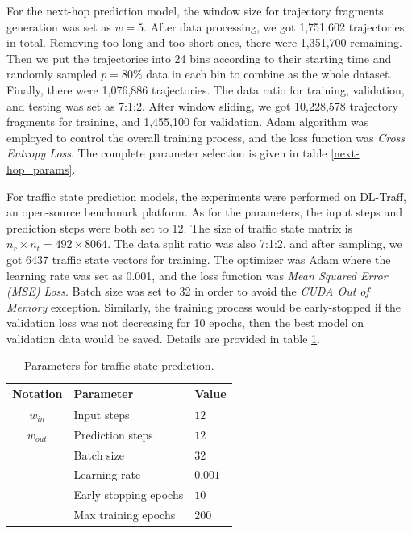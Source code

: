 For the next-hop prediction model, the window size for trajectory fragments generation was set as $w=5$. After data processing, we got 1,751,602 trajectories in total. Removing too long and too short ones, there were 1,351,700 remaining. Then we put the trajectories into 24 bins according to their starting time and randomly sampled $p=80\%$ data in each bin to combine as the whole dataset. Finally, there were 1,076,886 trajectories. The data ratio for training, validation, and testing was set as 7:1:2. After window sliding, we got 10,228,578 trajectory fragments for training, and 1,455,100 for validation. Adam\cite{adam} algorithm was employed to control the overall training process, and the loss function was \textit{Cross Entropy Loss}. The complete parameter selection is given in table \ref{next-hop_params}.

For traffic state prediction models, the experiments were performed on DL-Traff\cite{dl-traff}, an open-source benchmark platform. As for the parameters, the input steps and prediction steps were both set to 12. The size of traffic state matrix is $n_r\times n_t=492\times 8064$. The data split ratio was also 7:1:2, and after sampling, we got 6437 traffic state vectors for training. The optimizer was Adam where the learning rate was set as 0.001, and the loss function was \textit{Mean Squared Error (MSE) Loss}. Batch size was set to 32 in order to avoid the \textit{CUDA Out of Memory} exception. Similarly, the training process would be early-stopped if the validation loss was not decreasing for 10 epochs, then the best model on validation data would be saved. Details are provided in table \ref{traff_pred_params}.

\begin{table}[htb]
    \begin{center}
        \caption{Parameters for traffic state prediction.}
        \label{traff_pred_params}
        \begin{tabular}{cll}
            \toprule
  
            \textbf{Notation} & \textbf{Parameter} & \textbf{Value}\\
  
            \midrule
  
            $w_{in}$ & Input steps & $12$\\
            $w_{out}$ & Prediction steps & $12$\\
            ~ & Batch size & $32$\\
            ~ & Learning rate & $0.001$\\
            ~ & Early stopping epochs & $10$\\
            ~ & Max training epochs & $200$\\
  
            \bottomrule
        \end{tabular}
    \end{center}
\end{table}

